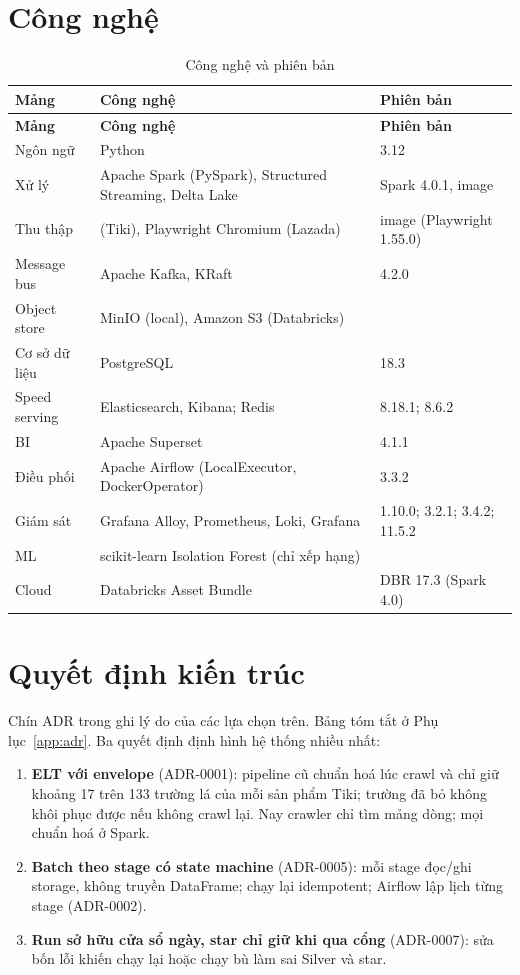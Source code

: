 \section{Công nghệ}\label{sec:tech}
\begin{xltabular}{\linewidth}{@{}L{30mm}Y L{52mm}@{}}
  \caption{Công nghệ và phiên bản}\label{tab:tech}\\
  \toprule
  \textbf{Mảng} & \textbf{Công nghệ} & \textbf{Phiên bản} \\
  \midrule
  \endfirsthead
  \toprule \textbf{Mảng} & \textbf{Công nghệ} & \textbf{Phiên bản} \\ \midrule
  \endhead
  Ngôn ngữ & Python & 3.12 \\
  Xử lý & Apache Spark (PySpark), Structured Streaming, Delta Lake & Spark 4.0.1, image  \\
  Thu thập &  (Tiki), Playwright Chromium (Lazada) & image  (Playwright 1.55.0) \\
  Message bus & Apache Kafka, KRaft & 4.2.0 \\
  Object store & MinIO (local), Amazon S3 (Databricks) & \\
  Cơ sở dữ liệu & PostgreSQL & 18.3 \\
  Speed serving & Elasticsearch, Kibana; Redis & 8.18.1; 8.6.2 \\
  BI & Apache Superset & 4.1.1 \\
  Điều phối & Apache Airflow (LocalExecutor, DockerOperator) & 3.3.2 \\
  Giám sát & Grafana Alloy, Prometheus, Loki, Grafana & 1.10.0; 3.2.1; 3.4.2; 11.5.2 \\
  ML & scikit-learn Isolation Forest (chỉ xếp hạng) & \\
  Cloud & Databricks Asset Bundle & DBR 17.3 (Spark 4.0) \\
  \bottomrule
\end{xltabular}

\section{Quyết định kiến trúc}
Chín ADR trong  ghi lý do của các lựa chọn trên. Bảng tóm tắt ở Phụ lục~\ref{app:adr}.
Ba quyết định định hình hệ thống nhiều nhất:

\begin{enumerate}
  \item \textbf{ELT với envelope } (ADR-0001): pipeline cũ chuẩn hoá lúc crawl và chỉ giữ khoảng 17 trên 133 trường lá
        của mỗi sản phẩm Tiki; trường đã bỏ không khôi phục được nếu không crawl lại. Nay crawler chỉ tìm mảng dòng; mọi chuẩn hoá ở Spark.
  \item \textbf{Batch theo stage có state machine} (ADR-0005): mỗi stage đọc/ghi storage, không truyền DataFrame; chạy lại idempotent; Airflow
        lập lịch từng stage (ADR-0002).
  \item \textbf{Run sở hữu cửa sổ ngày, star chỉ giữ khi qua cổng} (ADR-0007): sửa bốn lỗi khiến chạy lại hoặc chạy bù làm sai Silver và star.
\end{enumerate}
